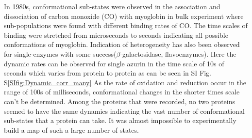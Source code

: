 \documentclass[journal=jacsat,manuscript=article]{achemso}
\begin{document}
In 1980s, conformational sub-states were observed in the association and dissociation of carbon monoxide (CO) with myoglobin in bulk experiment where sub-populations were found with different binding rates of CO.
The time scales of binding were stretched from microseconds to seconds indicating all possible conformations of myoglobin.
Indication of heterogeneity has also been observed for single-enzymes with some success($\beta$-galactosidase, flavoenzymes)\cite{lu1998single-molecule,kou2005single-molecule,english2006ever-fluctuating}.
Here the dynamic rates can be observed for single azurin in the time scale of 10s of seconds which varies from protein to protein as can be seen in SI Fig. S\ref{SIfig:Dynamic_corr_many}
As the rate of oxidation and reduction occur in the range of 100s of milliseconds, conformational changes in the shorter times scale can't be determined.
Among the proteins that were recorded, no two proteins seemed to have the same dynamics indicating the vast number of conformational sub-states that a protein can take.
It was almost impossible to experimentally build a map of such a large number of states.


\end{document}
